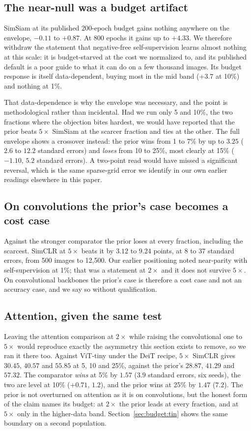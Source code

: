 \subsection{The near-null was a budget artifact}\label{sec:budget:simsiam}
SimSiam at its published 200-epoch budget gains nothing anywhere on the
envelope, $-0.11$ to $+0.87$. At 800 epochs it gains up to $+4.33$. We
therefore withdraw the statement that negative-free self-supervision learns
almost nothing at this scale: it is budget-starved at the cost we
normalized to, and its published default is a poor guide to what it can do
on a few thousand images. Its budget response is itself data-dependent,
buying most in the mid band ($+3.7$ at 10\%) and nothing at 1\%.

That data-dependence is why the envelope was necessary, and the point is
methodological rather than incidental. Had we run only 5 and 10\%, the two
fractions where the objection bites hardest, we would have reported that the
prior beats $5\times$ SimSiam at the scarcer fraction and ties at the other.
The full envelope shows a crossover instead: the prior wins from 1 to 7\% by
up to $3.25$ ($2.6$ to $12.2$ standard errors) and \emph{loses} from 10 to
25\%, most clearly at 15\% ($-1.10$, $5.2$ standard errors). A two-point
read would have missed a significant reversal, which is the same sparse-grid
error we identify in our own earlier readings elsewhere in this paper.

\subsection{On convolutions the prior's case becomes a cost
case}\label{sec:budget:conv}
Against the stronger comparator the prior loses at every fraction, including
the scarcest. SimCLR at $5\times$ beats it by $3.12$ to $9.24$ points, at 8
to 37 standard errors, from 500 images to 12{,}500. Our earlier positioning
noted near-parity with self-supervision at 1\%; that was a statement at
$2\times$ and it does not survive $5\times$. On convolutional backbones the
prior's case is therefore a cost case and not an accuracy case, and we say
so without qualification.

\subsection{Attention, given the same test}\label{sec:budget:vit}
Leaving the attention comparison at $2\times$ while raising the
convolutional one to $5\times$ would reproduce exactly the asymmetry this
section exists to remove, so we ran it there too. Against ViT-tiny under the
DeiT recipe, $5\times$ SimCLR gives $30.45$, $40.57$ and $55.85$ at 5, 10
and 25\%, against the prior's $28.87$, $41.29$ and $57.32$. The comparator
\emph{wins} at 5\% by $1.57$ ($3.9$ standard errors, six seeds), the two
are level at 10\% ($+0.71$, $1.2$), and the prior wins at 25\% by $1.47$
($7.2$). The
prior is not overturned on attention as it is on convolutions, but the
honest form of the claim names its budget: at $2\times$ the prior leads at
every fraction, and at $5\times$ only in the higher-data band.
Section~\ref{sec:budget:tin} shows the same boundary on a second
population.

